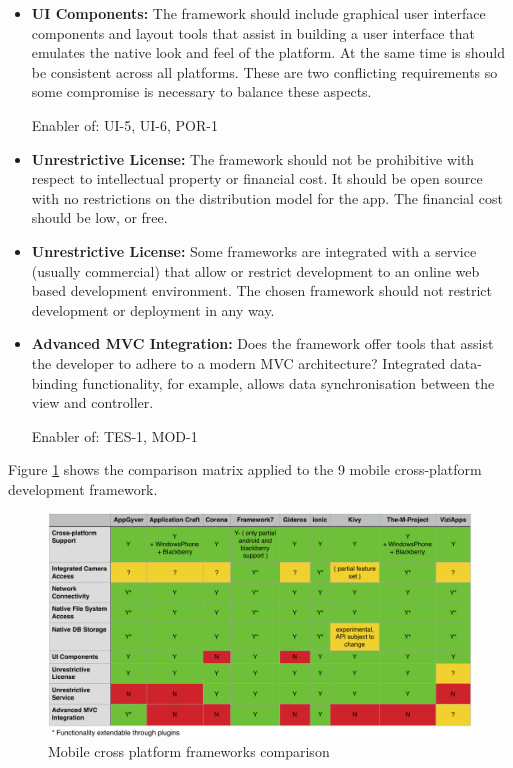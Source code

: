 \begin{itemize}[label={}]
Enabler of: INT-1, INT-2, INT-3, Metadata.Location.*, Metadata.Text.*, Archive.Save, Archive.Browse, Archive.Select.*

\item \textbf{UI Components:} The framework should include graphical user interface components and layout tools that assist in building a user interface that emulates the native look and feel of the platform. At the same time is should be consistent across all platforms. These are two conflicting requirements so some compromise is necessary to balance these aspects.

Enabler of: UI-5, UI-6, POR-1

\item \textbf{Unrestrictive License:} The framework should not be prohibitive with respect to intellectual property or financial cost. It should be open source with no restrictions on the distribution model for the app. The financial cost should be low, or free.

\item \textbf{Unrestrictive License:} Some frameworks are integrated with a service (usually commercial) that allow or restrict development to an online web based development environment. The chosen framework should not restrict development or deployment in any way.


\item \textbf{Advanced MVC Integration:} Does the framework offer tools that assist the developer to adhere to a modern MVC architecture? Integrated data-binding functionality, for example, allows data synchronisation between the view and controller.

Enabler of: TES-1, MOD-1

\end{itemize}

Figure \ref{fig:comp_fw} shows the comparison matrix applied to the 9 mobile cross-platform development framework.

\begin{figure}[H]
    \centering
    \includegraphics[width=\textwidth,keepaspectratio]{assets/architecture/framework_comparison.pdf}
    \caption{Mobile cross platform frameworks comparison}
    \label{fig:comp_fw}
\end{figure}

